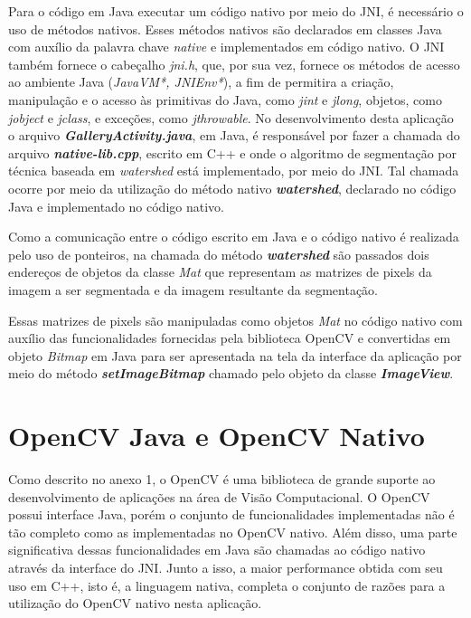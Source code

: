 Para o código em Java executar um código nativo por meio do JNI, é necessário o uso de métodos nativos. Esses métodos nativos são declarados em classes Java com auxílio da palavra chave \textit{native} e implementados em código nativo. 
O JNI também fornece o cabeçalho \textit{jni.h}, que, por sua vez, fornece os métodos de acesso ao ambiente Java (\textit{JavaVM*, JNIEnv*}), a fim de permitira a criação, manipulação e o acesso às primitivas do Java, como \textit{jint} e \textit{jlong}, objetos, como \textit{jobject} e \textit{jclass}, e exceções, como \textit{jthrowable}.
No desenvolvimento desta aplicação o arquivo \textbf{\textit{GalleryActivity.java}}, em Java, é responsável por fazer a chamada do arquivo \textbf{\textit{native-lib.cpp}}, escrito em C++ e onde o algoritmo de segmentação por técnica baseada em \textit{watershed} está implementado, por meio do JNI. Tal chamada ocorre por meio da utilização do método nativo \textbf{\textit{watershed}}, declarado no código Java e implementado no código nativo. 

Como a comunicação entre o código escrito em Java e o código nativo é realizada pelo uso de ponteiros, na chamada do método \textbf{\textit{watershed}} são passados dois endereços de objetos da classe \textit{Mat} que representam as matrizes de pixels da imagem a ser segmentada e da imagem resultante da segmentação.

Essas matrizes de pixels são manipuladas como objetos \textit{Mat} no código nativo com auxílio das funcionalidades fornecidas pela biblioteca OpenCV e convertidas em objeto \textit{Bitmap} em Java para ser apresentada na tela da interface da aplicação por meio do método \textbf{\textit{setImageBitmap}} chamado pelo objeto da classe \textbf{\textit{ImageView}}.

\section{OpenCV Java e OpenCV Nativo}\label{sec:opencv_java_nativo}
Como descrito no anexo 1, o OpenCV é uma biblioteca de grande suporte ao desenvolvimento de aplicações na área de Visão Computacional. O OpenCV possui interface Java, porém o conjunto de funcionalidades implementadas não é tão completo como as implementadas no OpenCV nativo. Além disso, uma parte significativa dessas funcionalidades em Java são chamadas ao código nativo através da interface do JNI. Junto a isso, a maior performance obtida com seu uso em C++, isto é, a linguagem nativa, completa o conjunto de razões para a utilização do OpenCV nativo nesta aplicação.

